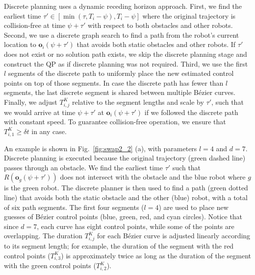 \documentclass{svproc}
\newcommand{\vo}{\mathbf{o}}
\begin{document}
Discrete planning uses a dynamic receding horizon approach. First, we find the earliest time $\tau'\in [\min(\tau, T_i-\psi), T_i-\psi]$ where the original trajectory is collision-free at time $\psi + \tau'$ with respect to both obstacles and other robots.
Second, we use a discrete graph search to find a path from the robot's current location to $\vo_i(\psi+\tau')$ that avoids both static obstacles and other robots.
If $\tau'$ does not exist or no solution path exists, we skip the discrete planning stage and construct the QP as if discrete planning was not required.
Third, we use the first $l$ segments of the discrete path to uniformly place the new estimated control points on top of those segments.
In case the discrete path has fewer than $l$ segments, the last discrete segment is shared between multiple B\'ezier curves.
Finally, we adjust $T_{i,j}^K$ relative to the segment lengths and scale by $\tau'$, such that we would arrive at time $\psi+\tau'$ at $\vo_i(\psi+\tau')$ if we followed the discrete path with constant speed.
To guarantee collision-free operation, we ensure that $T_{i,1}^K\geq \delta t$ in any case.

An example is shown in Fig.~\ref{fig:swap2_2} (a), with parameters $l=4$ and $d=7$.
Discrete planning is executed because the original trajectory (green dashed line) passes through an obstacle.
We find the earliest time $\tau'$ such that $R(\vo_g(\psi+\tau'))$ does not intersect with the obstacle and the blue robot where $g$ is the green robot.
The discrete planner is then used to find a path  (green dotted line) that avoids both the static obstacle and the other (blue) robot, with a total of six path segments.
The first four segments ($l=4$) are used to place new guesses of B\'ezier control points (blue, green, red, and cyan circles).
Notice that since $d=7$, each curve has eight control points, while some of the points are overlapping.
The duration $T^{K}_{i,j}$ for each B\'ezier curve is adjusted linearly according to its segment length; for example, the duration of the segment with the red control points ($T_{i,3}^K$) is approximately twice as long as the duration of the segment with the green control points ($T_{i,2}^K$).
\end{document}
